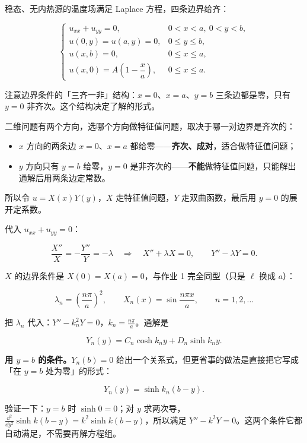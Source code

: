 \documentclass[11pt]{ctexart}
\begin{document}

稳态、无内热源的温度场满足 Laplace 方程，四条边界给齐：

\[
\begin{cases}
u_{xx}+u_{yy}=0, & 0<x<a,\ 0<y<b,\\[2pt]
u(0,y)=u(a,y)=0, & 0\le y\le b,\\[2pt]
u(x,b)=0, & 0\le x\le a,\\[2pt]
u(x,0)=A\left(1-\dfrac{x}{a}\right), & 0\le x\le a .
\end{cases}
\]

注意边界条件的「三齐一非」结构：$x=0$、$x=a$、$y=b$ 三条边都是零，只有 $y=0$ 非齐次。这个结构决定了解的形式。


二维问题有两个方向，选哪个方向做特征值问题，取决于哪一对边界是齐次的：

\begin{itemize}
  \item $x$ 方向的两条边 $x=0$、$x=a$ 都给零——\textbf{齐次、成对}，适合做特征值问题；
  \item $y$ 方向只有 $y=b$ 给零，$y=0$ 是非齐次的——\textbf{不能}做特征值问题，只能解出通解后用两条边定常数。
\end{itemize}

所以令 $u=X(x)Y(y)$，$X$ 走特征值问题，$Y$ 走双曲函数，最后用 $y=0$ 的展开定系数。


代入 $u_{xx}+u_{yy}=0$：

\[
\frac{X''}{X}=-\frac{Y''}{Y}=-\lambda
\quad\Longrightarrow\quad
X''+\lambda X=0,\qquad Y''-\lambda Y=0 .
\]

$X$ 的边界条件是 $X(0)=X(a)=0$，与作业 1 完全同型（只是 $\ell$ 换成 $a$）：

\[
\lambda_n=\left(\frac{n\pi}{a}\right)^2,
\qquad
X_n(x)=\sin\frac{n\pi x}{a},
\qquad n=1,2,\dots
\]


把 $\lambda_n$ 代入：$Y''-k_n^2Y=0$，$k_n=\frac{n\pi}{a}$。通解是

\[
Y_n(y)=C_n\cosh k_ny+D_n\sinh k_ny .
\]

\textbf{用 $y=b$ 的条件。}$Y_n(b)=0$ 给出一个关系式，但更省事的做法是直接把它写成「在 $y=b$ 处为零」的形式：

\[
Y_n(y)=\sinh k_n(b-y).
\]

验证一下：$y=b$ 时 $\sinh0=0$；对 $y$ 求两次导，$\frac{\dd^2}{\dd y^2}\sinh k(b-y)=k^2\sinh k(b-y)$，所以满足 $Y''-k^2Y=0$。这两个条件它都自动满足，不需要再解方程组。
\end{document}
